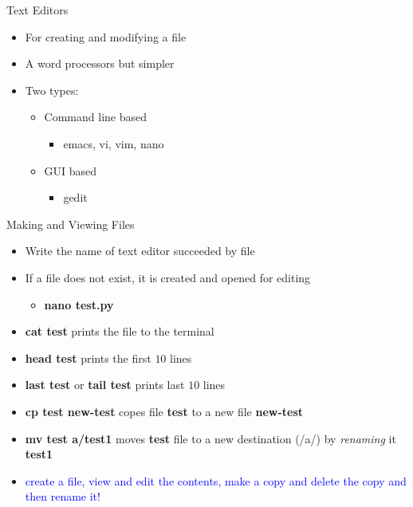 \begin{frame}{Text Editors}
	\begin{itemize}
		\item For creating and modifying a file
		\item A word processors but simpler
		\item Two types:
		\begin{itemize}
			\item Command line based
			\begin{itemize}
				\item emacs, vi, vim, nano
			\end{itemize}
			\item GUI based
			\begin{itemize}
				\item gedit
			\end{itemize}
		\end{itemize}
	\end{itemize}
\end{frame}

\begin{frame}{Making and Viewing Files}
	\begin{itemize}
		\item Write the name of text editor succeeded by file
		\item If a file does not exist, it is created and opened for editing
		\begin{itemize}
			\item \textbf{nano test.py}
		\end{itemize}
		\item \textbf{cat test} prints the file to the terminal
		\item \textbf{head test} prints the first $10$ lines
		\item \textbf{last test} or \textbf{tail test} prints last $10$ lines
		\item \textbf{cp test new-test} copes file \textbf{test} to a new file \textbf{new-test}
		\item \textbf{mv test a/test1} moves \textbf{test} file to a new destination (/a/) by \textit{renaming} it \textbf{test1}
		\item \textcolor{blue}{create a file, view and edit the contents, make a copy and delete the copy and then rename it!}
	\end{itemize}
\end{frame}

